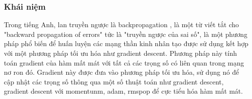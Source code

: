 \subsubsection{Khái niệm}
Trong tiếng Anh, lan truyền ngược là backpropagation \cite{cs231n}, là một từ viết tắt cho "backward propagation of errors" tức là "truyền ngược của sai số", là một phương pháp phổ biến để huấn luyện các mạng thần kinh nhân tạo được sử dụng kết hợp với một phương pháp tối ưu hóa như gradient descent. Phương pháp này tính toán gradient của hàm mất mát với tất cả các trọng số có liên quan trong mạng nơ ron đó. Gradient này được đưa vào phương pháp tối ưu hóa, sử dụng nó để cập nhật các trọng số thông qua một số thuật toán như gradient descent, gradient descent với momentunm, adam, rmspop để cực tiểu hóa hàm mất mát.

